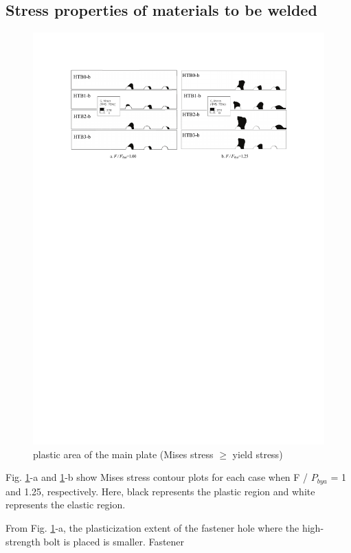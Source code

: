 \subsection{Stress properties of materials to be welded}

\begin{figure}
    \centering
    \includegraphics[width=\textwidth]{imgs/ch4/fig21.pdf}
    \caption{plastic area of the main plate (Mises stress $\geq$ yield stress)}
    \label{ch4fig21}
\end{figure}

Fig. \ref{ch4fig21}-a and \ref{ch4fig21}-b show Mises stress contour plots for each case when F / $P_{bya}$  = 1 and 1.25, respectively. Here, black represents the plastic region and white represents the elastic region.

From Fig. \ref{ch4fig21}-a, the plasticization extent of the fastener hole where the high-strength bolt is placed is smaller. Fastener

